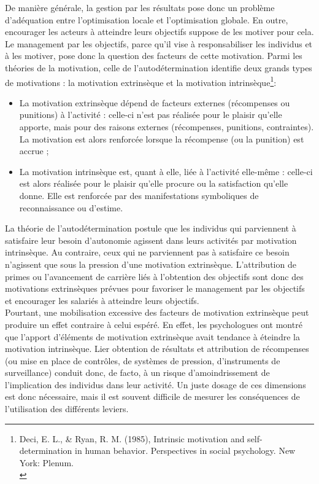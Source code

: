 \documentclass{kaobook}
\begin{document}
De manière générale, la gestion par les résultats pose donc un problème d’adéquation entre l’optimisation locale et l’optimisation globale. En outre, encourager les acteurs à atteindre leurs objectifs suppose de les motiver pour cela. Le management par les objectifs, parce qu’il vise à responsabiliser les individus et à les motiver, pose donc la question des facteurs de cette motivation. Parmi les théories de la motivation, celle de l’autodétermination identifie deux grands types de motivations : la motivation extrinsèque et la motivation intrinsèque\footnote{Deci, E. L., \& Ryan, R. M. (1985), Intrinsic motivation and self-determination in human behavior. Perspectives in social psychology. New York: Plenum.\\}:\\
\begin{itemize}
\item La motivation extrinsèque dépend de facteurs externes (récompenses ou punitions) à l’activité : celle-ci n’est pas réalisée pour le plaisir qu’elle apporte, mais pour des raisons externes (récompenses, punitions, contraintes). La motivation est alors renforcée lorsque la récompense (ou la punition) est accrue ;\\
\item La motivation intrinsèque est, quant à elle, liée à l’activité elle-même : celle-ci est alors réalisée pour le plaisir qu’elle procure ou la satisfaction qu’elle donne. Elle est renforcée par des manifestations symboliques de reconnaissance ou d’estime.\\
\end{itemize}

La théorie de l’autodétermination postule que les individus qui parviennent à satisfaire leur besoin d’autonomie agissent dans leurs activités par motivation intrinsèque. Au contraire, ceux qui ne parviennent pas à satisfaire ce besoin n’agissent que sous la pression d’une motivation extrinsèque. L’attribution de primes ou l’avancement de carrière liés à l’obtention des objectifs sont donc des motivations extrinsèques prévues pour favoriser le management par les objectifs et encourager les salariés à atteindre leurs objectifs.\\

Pourtant, une mobilisation excessive des facteurs de motivation extrinsèque peut produire un effet contraire à celui espéré. En effet, les psychologues ont montré que l’apport d’éléments de motivation extrinsèque avait tendance à éteindre la motivation intrinsèque. Lier obtention de résultats et attribution de récompenses (ou mise en place de contrôles, de systèmes de pression, d’instruments de surveillance) conduit donc, de facto, à un risque d’amoindrissement de l’implication des individus dans leur activité. Un juste dosage de ces dimensions est donc nécessaire, mais il est souvent difficile de mesurer les conséquences de l’utilisation des différents leviers.\\
\end{document}
